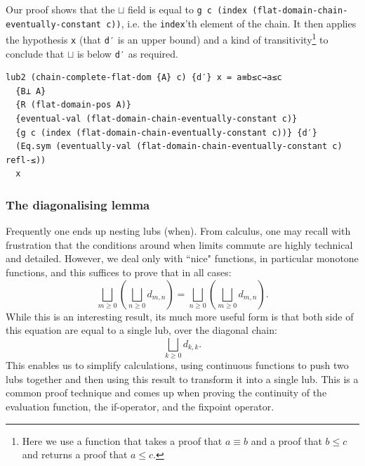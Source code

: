 \documentclass[12pt,a4paper,twoside,openright]{report}
\begin{document}
\begin{itemize}
Our proof shows that the $\sqcup$ field is equal to \texttt{g c (index (flat-domain-chain-eventually-constant c))}, i.e. the \texttt{index}'th element of the chain. It then applies the hypothesis \texttt{x} (that \texttt{d′} is an upper bound) and a kind of transitivity\footnote{Here we use a function that takes a proof that $a \equiv b$ and a proof that $b \leq c$ and returns a proof that $a \leq c$.} to conclude that $\sqcup$ is below \texttt{d′} as required. 
\begin{verbatim}
lub2 (chain-complete-flat-dom {A} c) {d′} x = a≡b≤c→a≤c
  {B⊥ A}
  {R (flat-domain-pos A)}
  {eventual-val (flat-domain-chain-eventually-constant c)}
  {g c (index (flat-domain-chain-eventually-constant c))} {d′}
  (Eq.sym (eventually-val (flat-domain-chain-eventually-constant c) refl-≤))
  x
\end{verbatim}
\end{itemize}
\subsubsection{The diagonalising lemma}
Frequently one ends up nesting lubs (when). From calculus, one may recall with frustration that the conditions around when limits commute are highly technical and detailed. However, we deal only with ``nice" functions, in particular monotone functions, and this suffices to prove that in all cases:
\begin{equation} \label{comm-double-lub}
\bigsqcup_{m \geq 0} \left( \bigsqcup_{n \geq 0} d_{m, n}\right) = 	\bigsqcup_{n \geq 0} \left( \bigsqcup_{m \geq 0} d_{m, n}\right).
\end{equation}
While this is an interesting result, its much more useful form is that both side of this equation are equal to a single lub, over the diagonal chain:
\begin{equation} \label{diag}
\bigsqcup_{k \geq 0} d_{k, k}.
\end{equation}
This enables us to simplify calculations, using continuous functions to push two lubs together and then using this result to transform it into a single lub. This is a common proof technique and comes up when proving the continuity of the evaluation function, the if-operator, and the fixpoint operator. 
\end{document}
